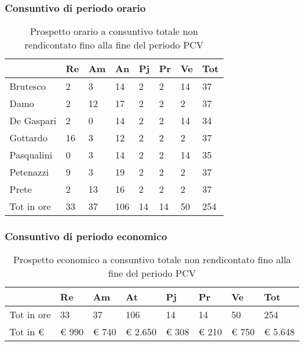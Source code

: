 		\subsubsection{Consuntivo di periodo orario}
						\begin{table}[h] \begin{center} \begin{tabular}{llllllll}																						
						\toprule
									&	Re		&	Am		&	An		&	Pj		&	Pr		&	Ve		&	Tot	 \\ 	
						\midrule																					
						Brutesco	&	2		&	3		&	14		&	2		&	2		&	14		&	37		\\
						Damo	&	2		&	12		&	17		&	2		&	2		&	2		&	37		\\
						De Gaspari	&	2		&	0		&	14		&	2		&	2		&	14		&	34		\\
						Gottardo	&	16		&	3		&	12		&	2		&	2		&	2		&	37		\\
						Pasqualini	&	0		&	3		&	14		&	2		&	2		&	14		&	35		\\
						Petenazzi	&	9		&	3		&	19		&	2		&	2		&	2		&	37		\\
						Prete	&	2		&	13		&	16		&	2	&	2		&	2		&	37		\\
						\midrule																Tot in ore	&	33		&	37		&	106		&	14		&	14		&	50		&	254		\\	
						\bottomrule																						
						\end{tabular} \end{center} \caption{Prospetto orario a consuntivo totale non rendicontato fino alla fine del periodo PCV																						
						}\label{tab:oreNonRend} \end{table}							
		\subsubsection{Consuntivo di periodo economico}
						\begin{table}[H] \begin{center} \begin{tabular}{llllllll}
						\toprule
							&	\textbf{Re}	&	\textbf{Am}	&	\textbf{At}	&	\textbf{Pj}	&	\textbf{Pr}	&	\textbf{Ve}	&	\textbf{Tot}\\
			
						\midrule
						Tot in ore	&	33		&	37		&	106		&	14		&	14		&	50		&	254		\\
						Tot in €	&	 € 990 		 & 	 € 740 		 & 	 € 2.650 		 & 	 € 308 		 & 	 € 210 		 & 	 € 750 		 & 	 € 5.648 		\\
						\bottomrule
						\end{tabular} \end{center} \caption{Prospetto economico a consuntivo totale non rendicontato fino alla fine del periodo PCV		
						}\label{tab:s_TotaleNonRendicontato} \end{table}
	
